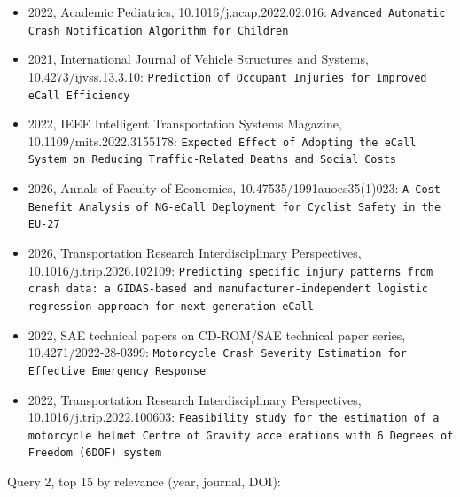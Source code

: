 \begin{itemize}
\item 2022, Academic Pediatrics, 10.1016/j.acap.2022.02.016: \texttt{Advanced Automatic Crash Notification Algorithm for Children}
\item 2021, International Journal of Vehicle Structures and Systems, 10.4273/ijvss.13.3.10: \texttt{Prediction of Occupant Injuries for Improved eCall Efficiency}
\item 2022, IEEE Intelligent Transportation Systems Magazine, 10.1109/mits.2022.3155178: \texttt{Expected Effect of Adopting the eCall System on Reducing Traffic-Related Deaths and Social Costs}
\item 2026, Annals of Faculty of Economics, 10.47535/1991auoes35(1)023: \texttt{A Cost--Benefit Analysis of NG-eCall Deployment for Cyclist Safety in the EU-27}
\item 2026, Transportation Research Interdisciplinary Perspectives, 10.1016/j.trip.2026.102109: \texttt{Predicting specific injury patterns from crash data: a GIDAS-based and manufacturer-independent logistic regression approach for next generation eCall}
\item 2022, SAE technical papers on CD-ROM/SAE technical paper series, 10.4271/2022-28-0399: \texttt{Motorcycle Crash Severity Estimation for Effective Emergency Response}
\item 2022, Transportation Research Interdisciplinary Perspectives, 10.1016/j.trip.2022.100603: \texttt{Feasibility study for the estimation of a motorcycle helmet Centre of Gravity accelerations with 6 Degrees of Freedom (6DOF) system}
\end{itemize}

Query 2, top 15 by relevance (year, journal, DOI):

